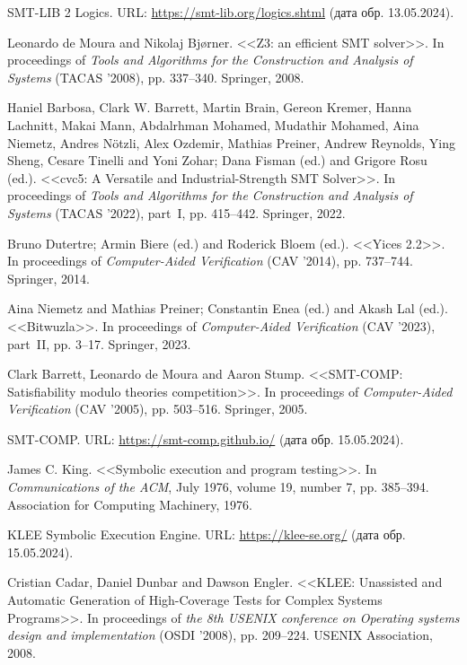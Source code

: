 \begin{thebibliography}{1}

 SMT-LIB 2 Logics. URL: \url{https://smt-lib.org/logics.shtml} (дата обр. 13.05.2024).

 Leonardo de Moura and Nikolaj Bjørner. <<Z3: an efficient SMT solver>>. In proceedings of \textit{Tools and Algorithms for the Construction and Analysis of Systems} (TACAS '2008), pp. 337--340. Springer, 2008.

 Haniel Barbosa, Clark W. Barrett, Martin Brain, Gereon Kremer, Hanna Lachnitt, Makai Mann, Abdalrhman Mohamed, Mudathir Mohamed, Aina Niemetz, Andres N{\"{o}}tzli, Alex Ozdemir, Mathias Preiner, Andrew Reynolds, Ying Sheng, Cesare Tinelli and Yoni Zohar; Dana Fisman (ed.) and Grigore Rosu (ed.). <<cvc5: {A} Versatile and Industrial-Strength {SMT} Solver>>. In proceedings of \textit{Tools and Algorithms for the Construction and Analysis of Systems} (TACAS '2022), part~{I}, pp. 415--442. Springer, 2022.

 Bruno Dutertre; Armin Biere (ed.) and Roderick Bloem (ed.). <<Yices 2.2>>. In proceedings of \textit{Computer-Aided Verification} (CAV '2014), pp. 737--744. Springer, 2014.

 Aina Niemetz and Mathias Preiner; Constantin Enea (ed.) and Akash Lal (ed.). <<Bitwuzla>>. In proceedings of \textit{Computer-Aided Verification} (CAV '2023), part~{II}, pp. 3--17. Springer, 2023.

 Clark Barrett, Leonardo de Moura and Aaron Stump. <<SMT-COMP: Satisfiability modulo theories competition>>. In proceedings of \textit{Computer-Aided Verification} (CAV '2005), pp. 503--516. Springer, 2005.

 SMT-COMP. URL: \url{https://smt-comp.github.io/} (дата обр. 15.05.2024).

 James C. King. <<Symbolic execution and program testing>>. In \textit{Communications of the ACM}, July 1976, volume 19, number 7, pp. 385--394. Association for Computing Machinery, 1976.

 KLEE Symbolic Execution Engine. URL: \url{https://klee-se.org/} (дата обр. 15.05.2024).

 Cristian Cadar, Daniel Dunbar and Dawson Engler. <<KLEE: Unassisted and Automatic Generation of High-Coverage Tests for Complex Systems Programs>>. In proceedings of \textit{the 8th USENIX conference on Operating systems design and implementation} (OSDI '2008), pp. 209--224. USENIX Association, 2008.


\end{thebibliography}

